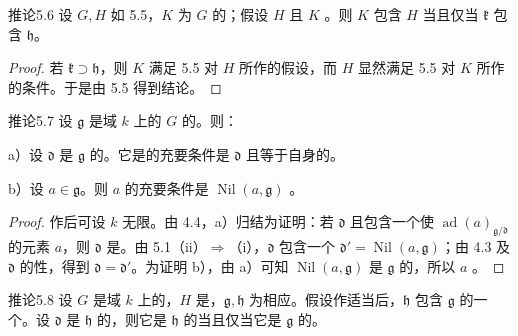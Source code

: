 \begin{SGAresult}{推论}{5.6}
设 $G,H$ 如 5.5，$K$ 为 $G$ 的；假设 $H$ 且 $K$ 。则 $K$ 包含 $H$ 当且仅当 $\mathfrak k$ 包含 $\mathfrak h$。
\end{SGAresult}
\begin{proof}
若 $\mathfrak k\supset\mathfrak h$，则 $K$ 满足 5.5 对 $H$ 所作的假设，而 $H$ 显然满足 5.5 对 $K$ 所作的条件。于是由 5.5 得到结论。
\end{proof}
\begin{SGAresult}{推论}{5.7}
设 $\mathfrak g$ 是域 $k$ 上的 $G$ 的。则：

 a）设 $\mathfrak d$ 是 $\mathfrak g$ 的。它是的充要条件是 $\mathfrak d$ 且等于自身的。

 b）设 $a\in\mathfrak g$。则 $a$ 的充要条件是 $\operatorname{Nil}(a,\mathfrak g)$ 。
\end{SGAresult}
\begin{proof}
作后可设 $k$ 无限。由 4.4，a）归结为证明：若 $\mathfrak d$ 且包含一个使 $\operatorname{ad}(a)_{\mathfrak g/\mathfrak d}$ 的元素 $a$，则 $\mathfrak d$ 是。由 5.1（ii）$\Rightarrow$（i），$\mathfrak d$ 包含一个 $\mathfrak d'=\operatorname{Nil}(a,\mathfrak g)$；由 4.3 及 $\mathfrak d$ 的性，得到 $\mathfrak d=\mathfrak d'$。为证明 b），由 a）可知 $\operatorname{Nil}(a,\mathfrak g)$ 是 $\mathfrak g$ 的，所以 $a$ 。
\end{proof}
\begin{SGAresult}{推论}{5.8}
设 $G$ 是域 $k$ 上的，$H$ 是，$\mathfrak g,\mathfrak h$ 为相应。假设作适当后，$\mathfrak h$ 包含 $\mathfrak g$ 的一个。设 $\mathfrak d$ 是 $\mathfrak h$ 的，则它是 $\mathfrak h$ 的当且仅当它是 $\mathfrak g$ 的。
\end{SGAresult}
